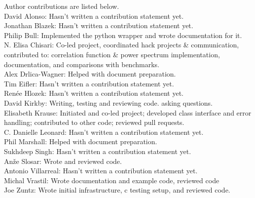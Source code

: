 Author contributions are listed below. \\
David Alonso: Hasn't written a contribution statement yet. \\
Jonathan Blazek: Hasn't written a contribution statement yet. \\
Philip Bull: Implemented the python wrapper and wrote documentation for it. \\
N. Elisa Chisari: Co-led project, coordinated hack projects \& communication, contributed to: correlation function \& power spectrum implementation, documentation, and comparisons with benchmarks. \\
Alex Drlica-Wagner: Helped with document preparation. \\
Tim Eifler: Hasn't written a contribution statement yet. \\
Ren\'ee Hlozek: Hasn't written a contribution statement yet. \\
David Kirkby: Writing, testing and reviewing code. asking questions. \\
Elisabeth Krause: Initiated and co-led project; developed class interface and error handling; contributed to other code; reviewed pull requests. \\
C. Danielle Leonard: Hasn't written a contribution statement yet. \\
Phil Marshall: Helped with document preparation. \\
Sukhdeep Singh: Hasn't written a contribution statement yet. \\
An\v{z}e Slosar: Wrote and reviewed code. \\
Antonio Villarreal: Hasn't written a contribution statement yet. \\
Michal Vrastil: Wrote documentation and example code, reviewed code \\
Joe Zuntz: Wrote initial infrastructure, c testing setup, and reviewed code. \\
